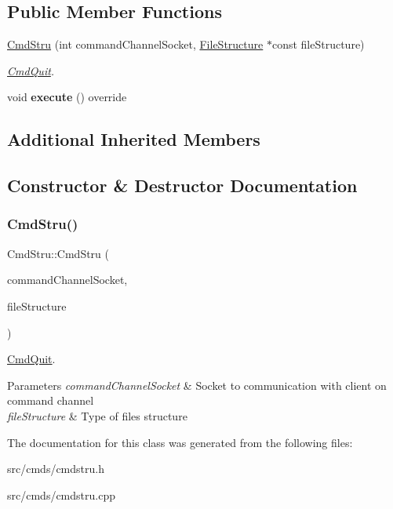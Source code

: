 \subsection*{Public Member Functions}
\begin{DoxyCompactItemize}
\item 
\hyperlink{classCmdStru_a1c3d22047704a9f0fc24015287f3a356}{Cmd\+Stru} (int command\+Channel\+Socket, \hyperlink{classFileStructure}{File\+Structure} $\ast$const file\+Structure)
\begin{DoxyCompactList}\small\item\em \hyperlink{classCmdQuit}{Cmd\+Quit}. \end{DoxyCompactList}\item 
\mbox{\label{classCmdStru_acda350a5abfd38670ad0fb337d651e4d}} 
void {\bfseries execute} () override
\end{DoxyCompactItemize}
\subsection*{Additional Inherited Members}


\subsection{Constructor \& Destructor Documentation}
\mbox{\label{classCmdStru_a1c3d22047704a9f0fc24015287f3a356}} 
\subsubsection{\texorpdfstring{Cmd\+Stru()}{CmdStru()}}
{\footnotesize\ttfamily Cmd\+Stru\+::\+Cmd\+Stru (\begin{DoxyParamCaption}\item[{int}]{command\+Channel\+Socket,  }\item[{\hyperlink{classFileStructure}{File\+Structure} $\ast$const}]{file\+Structure }\end{DoxyParamCaption})}



\hyperlink{classCmdQuit}{Cmd\+Quit}. 


\begin{DoxyParams}{Parameters}
{\em command\+Channel\+Socket} & Socket to communication with client on command channel \\
\hline
{\em file\+Structure} & Type of files structure \\
\hline
\end{DoxyParams}


The documentation for this class was generated from the following files\+:\begin{DoxyCompactItemize}
\item 
src/cmds/cmdstru.\+h\item 
src/cmds/cmdstru.\+cpp\end{DoxyCompactItemize}
